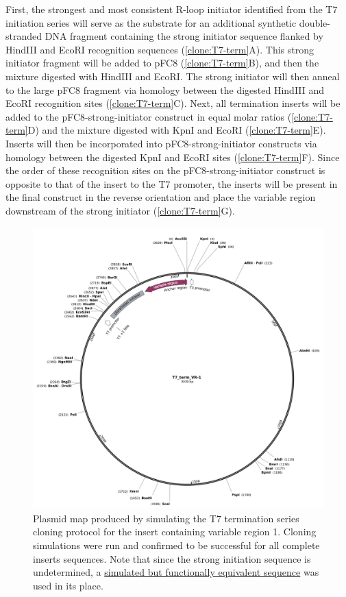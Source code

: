 \documentclass[11pt]{article}
\begin{document}
 First, the strongest and most consistent R-loop initiator identified from the T7 initiation series will serve as the substrate for an additional synthetic double-stranded DNA fragment containing the strong initiator sequence flanked by  HindIII and EcoRI recognition sequences (\ref{clone:T7-term}A). This strong initiator fragment will be added to pFC8  (\ref{clone:T7-term}B), and then the mixture digested with HindIII and EcoRI. The strong initiator will then anneal to the large pFC8 fragment via homology between the digested HindIII and EcoRI recognition sites (\ref{clone:T7-term}C). Next, all termination inserts will be added to the pFC8-strong-initiator construct in equal molar ratios (\ref{clone:T7-term}D) and the mixture digested with KpnI and EcoRI (\ref{clone:T7-term}E). Inserts will then be incorporated into pFC8-strong-initiator constructs via homology between the digested KpnI and EcoRI sites (\ref{clone:T7-term}F). Since the order of these recognition sites on the pFC8-strong-initiator construct is opposite to that of the insert to the T7 promoter, the inserts will be present in the final construct in the reverse orientation and place the variable region downstream of the strong initiator (\ref{clone:T7-term}G). 
 
 \begin{figure}[H]
 	\includegraphics[width=12cm]{images/plasmid_maps/T7_term_VR-1 Map.png}
 	\centering
 	\caption{Plasmid map produced by simulating the T7 termination series cloning protocol for the insert containing variable region 1. Cloning simulations were run and confirmed to be successful for all complete inserts sequences. Note that since the strong initiation sequence is undetermined, a  \href{https://github.com/EthanHolleman/plasmid-VR-design/blob/main/notes/placeholder_strong_initiator.ipynb}{simulated but functionally equivalent sequence} was used in its place.}
 	\label{clone:T7-term-insert-simulated}
 \end{figure}
 
\end{document}
